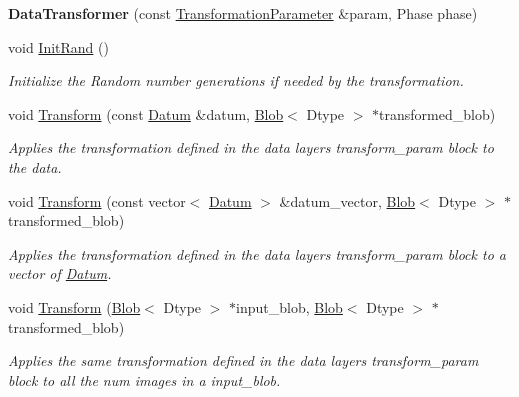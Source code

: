\begin{DoxyCompactItemize}
\item 
\mbox{\label{classcaffe_1_1_data_transformer_ae598f617042b2d68f4bab0dd3bd542f0}} 
{\bfseries Data\+Transformer} (const \mbox{\hyperlink{classcaffe_1_1_transformation_parameter}{Transformation\+Parameter}} \&param, Phase phase)
\item 
\mbox{\label{classcaffe_1_1_data_transformer_a6d807c7dc250e66b62d97d9847278e68}} 
void \mbox{\hyperlink{classcaffe_1_1_data_transformer_a6d807c7dc250e66b62d97d9847278e68}{Init\+Rand}} ()
\begin{DoxyCompactList}\small\item\em Initialize the Random number generations if needed by the transformation. \end{DoxyCompactList}\item 
void \mbox{\hyperlink{classcaffe_1_1_data_transformer_a1626db49587d506a91e7b70373ace816}{Transform}} (const \mbox{\hyperlink{classcaffe_1_1_datum}{Datum}} \&datum, \mbox{\hyperlink{classcaffe_1_1_blob}{Blob}}$<$ Dtype $>$ $\ast$transformed\+\_\+blob)
\begin{DoxyCompactList}\small\item\em Applies the transformation defined in the data layer\textquotesingle{}s transform\+\_\+param block to the data. \end{DoxyCompactList}\item 
void \mbox{\hyperlink{classcaffe_1_1_data_transformer_a082cad626c5f51c9f8d93bb88cca1bd0}{Transform}} (const vector$<$ \mbox{\hyperlink{classcaffe_1_1_datum}{Datum}} $>$ \&datum\+\_\+vector, \mbox{\hyperlink{classcaffe_1_1_blob}{Blob}}$<$ Dtype $>$ $\ast$transformed\+\_\+blob)
\begin{DoxyCompactList}\small\item\em Applies the transformation defined in the data layer\textquotesingle{}s transform\+\_\+param block to a vector of \mbox{\hyperlink{classcaffe_1_1_datum}{Datum}}. \end{DoxyCompactList}\item 
void \mbox{\hyperlink{classcaffe_1_1_data_transformer_a168abf1bf9466420da6968178c6edb4d}{Transform}} (\mbox{\hyperlink{classcaffe_1_1_blob}{Blob}}$<$ Dtype $>$ $\ast$input\+\_\+blob, \mbox{\hyperlink{classcaffe_1_1_blob}{Blob}}$<$ Dtype $>$ $\ast$transformed\+\_\+blob)
\begin{DoxyCompactList}\small\item\em Applies the same transformation defined in the data layer\textquotesingle{}s transform\+\_\+param block to all the num images in a input\+\_\+blob. \end{DoxyCompactList}\item 

\end{DoxyCompactItemize}
